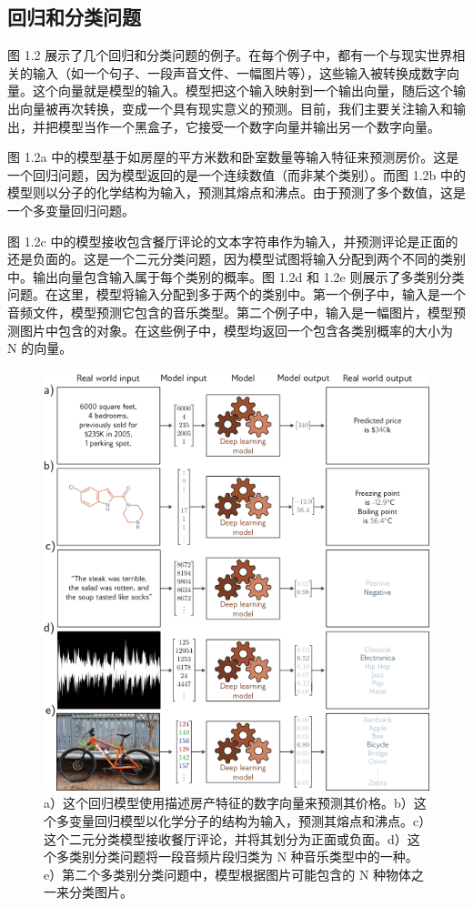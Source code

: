 \subsection{回归和分类问题}
图 1.2 展示了几个回归和分类问题的例子。在每个例子中，都有一个与现实世界相关的输入（如一个句子、一段声音文件、一幅图片等），这些输入被转换成数字向量。这个向量就是模型的输入。模型把这个输入映射到一个输出向量，随后这个输出向量被再次转换，变成一个具有现实意义的预测。目前，我们主要关注输入和输出，并把模型当作一个黑盒子，它接受一个数字向量并输出另一个数字向量。

图 1.2a 中的模型基于如房屋的平方米数和卧室数量等输入特征来预测房价。这是一个回归问题，因为模型返回的是一个连续数值（而非某个类别）。而图 1.2b 中的模型则以分子的化学结构为输入，预测其熔点和沸点。由于预测了多个数值，这是一个多变量回归问题。

图 1.2c 中的模型接收包含餐厅评论的文本字符串作为输入，并预测评论是正面的还是负面的。这是一个二元分类问题，因为模型试图将输入分配到两个不同的类别中。输出向量包含输入属于每个类别的概率。图 1.2d 和 1.2e 则展示了多类别分类问题。在这里，模型将输入分配到多于两个的类别中。第一个例子中，输入是一个音频文件，模型预测它包含的音乐类型。第二个例子中，输入是一幅图片，模型预测图片中包含的对象。在这些例子中，模型均返回一个包含各类别概率的大小为 N 的向量。

\begin{figure}
	\centering
	\includegraphics[width=0.7\linewidth]{png/chapter1/IntroModels}
	\caption{a）这个回归模型使用描述房产特征的数字向量来预测其价格。b）这个多变量回归模型以化学分子的结构为输入，预测其熔点和沸点。c）这个二元分类模型接收餐厅评论，并将其划分为正面或负面。d）这个多类别分类问题将一段音频片段归类为 N 种音乐类型中的一种。e）第二个多类别分类问题中，模型根据图片可能包含的 N 种物体之一来分类图片。}
\end{figure}




